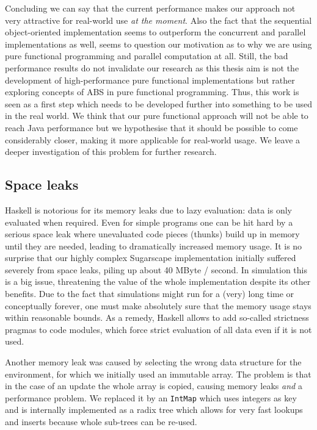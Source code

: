 Concluding we can say that the current performance makes our approach not very attractive for real-world use \textit{at the moment}. Also the fact that the sequential object-oriented implementation seems to outperform the concurrent and parallel implementations as well, seems to question our motivation as to why we are using pure functional programming and parallel computation at all. Still, the bad performance results do not invalidate our research as this thesis aim is not the development of high-performance pure functional implementations but rather exploring concepts of ABS in pure functional programming. Thus, this work is seen as a first step which needs to be developed further into something to be used in the real world. We think that our pure functional approach will not be able to reach Java performance but we hypothesise that it should be possible to come considerably closer, making it more applicable for real-world usage. We leave a deeper investigation of this problem for further research.

\subsection{Space leaks}
Haskell is notorious for its memory leaks due to lazy evaluation: data is only evaluated when required. Even for simple programs one can be hit hard by a serious space leak where unevaluated code pieces (thunks) build up in memory until they are needed, leading to dramatically increased memory usage. It is no surprise that our highly complex Sugarscape implementation initially suffered severely from space leaks, piling up about 40 MByte / second. In simulation this is a big issue, threatening the value of the whole implementation despite its other benefits. Due to the fact that simulations might run for a (very) long time or conceptually forever, one must make absolutely sure that the memory usage stays within reasonable bounds. As a remedy, Haskell allows to add so-called strictness pragmas to code modules, which force strict evaluation of all data even if it is not used. %

Another memory leak was caused by selecting the wrong data structure for the environment, for which we initially used an immutable array. The problem is that in the case of an update the whole array is copied, causing memory leaks \textit{and} a performance problem. We replaced it by an \texttt{IntMap} which uses integers as key and is internally implemented as a radix tree which allows for very fast lookups and inserts because whole sub-trees can be re-used.

